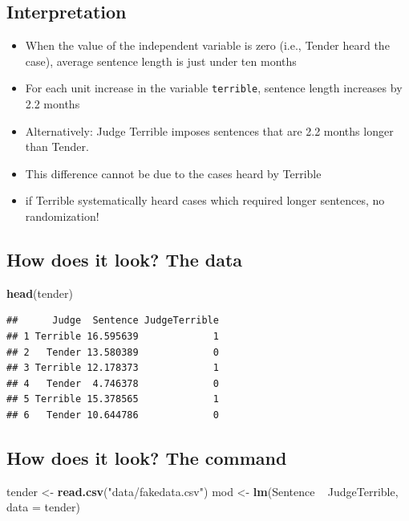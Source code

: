 \documentclass[12pt,twoside]{article}
\newenvironment{Shaded}{}{}
\newcommand{\KeywordTok}[1]{\textcolor[rgb]{0.00,0.44,0.13}{\textbf{{#1}}}}
\newcommand{\DataTypeTok}[1]{\textcolor[rgb]{0.56,0.13,0.00}{{#1}}}
\newcommand{\StringTok}[1]{\textcolor[rgb]{0.25,0.44,0.63}{{#1}}}
\newcommand{\NormalTok}[1]{{#1}}
\providecommand{\tightlist}{%
  \setlength{\itemsep}{0pt}\setlength{\parskip}{0pt}}
\begin{document}
\subsection{Interpretation}\label{interpretation-2}

\begin{itemize}
\tightlist
\item
  When the value of the independent variable is zero (i.e., Tender heard
  the case), average sentence length is just under ten months
\item
  For each unit increase in the variable \texttt{terrible}, sentence
  length increases by 2.2 months
\item
  Alternatively: Judge Terrible imposes sentences that are 2.2 months
  longer than Tender.
\item
  This difference cannot be due to the cases heard by Terrible
\item
  if Terrible systematically heard cases which required longer
  sentences, no randomization!
\end{itemize}

\subsection{How does it look? The data}\label{how-does-it-look-the-data}

\begin{Shaded}
\begin{Highlighting}[]
\KeywordTok{head}\NormalTok{(tender)}
\end{Highlighting}
\end{Shaded}

\begin{verbatim}
##      Judge  Sentence JudgeTerrible
## 1 Terrible 16.595639             1
## 2   Tender 13.580389             0
## 3 Terrible 12.178373             1
## 4   Tender  4.746378             0
## 5 Terrible 15.378565             1
## 6   Tender 10.644786             0
\end{verbatim}

\subsection{How does it look? The
command}\label{how-does-it-look-the-command}

\begin{Shaded}
\begin{Highlighting}[]
\NormalTok{tender <-}\StringTok{ }\KeywordTok{read.csv}\NormalTok{(}\StringTok{"data/fakedata.csv"}\NormalTok{)}
\NormalTok{mod <-}\StringTok{ }\KeywordTok{lm}\NormalTok{(Sentence ~}\StringTok{ }\NormalTok{JudgeTerrible, }\DataTypeTok{data =} \NormalTok{tender)}
\end{Highlighting}
\end{Shaded}
\end{document}
